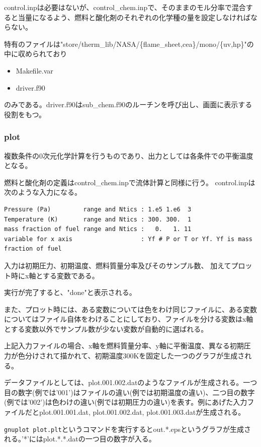 \documentclass{jsarticle}
\begin{document}
control.inpは必要はないが、control\_chem.inpで、そのままのモル分率で混合すると当量になるよう、燃料と酸化剤のそれぞれの化学種の量を設定しなければならない。

\hspace{1em}

特有のファイルは"store/therm\_lib/NASA/\{flame\_sheet,cea\}/mono/\{uv,hp\}"の中に収められており
\begin{itemize}
\item Makefile.var
\item driver.f90
\end{itemize}
のみである。driver.f90はsub\_chem.f90のルーチンを呼び出し、画面に表示する役割をもつ。
\subsubsection{plot}%
複数条件の0次元化学計算を行うものであり、出力としては各条件での平衡温度となる。

燃料と酸化剤の定義はcontrol\_chem.inpで流体計算と同様に行う。
control.inpは次のような入力になる。
\begin{verbatim}
Pressure (Pa)         range and Ntics : 1.e5 1.e6  3
Temperature (K)       range and Ntics : 300. 300.  1
mass fraction of fuel range and Ntics :   0.   1. 11
variable for x axis                   : Yf # P or T or Yf. Yf is mass fraction of fuel
\end{verbatim}
入力は初期圧力、初期温度、燃料質量分率及びそのサンプル数、
加えてプロット時にx軸とする変数である。

実行が完了すると、"done"と表示される。

また、プロット時には、ある変数については色をわけ同じファイルに、ある変数についてはファイル自体をわけることにしており、ファイルを分ける変数はx軸とする変数以外でサンプル数が少ない変数が自動的に選ばれる。

上記入力ファイルの場合、x軸を燃料質量分率、y軸に平衡温度、異なる初期圧力が色分けされて描かれて、初期温度300Kを固定した一つのグラフが生成される。

データファイルとしては、plot.001.002.datのようなファイルが生成される。一つ目の数字(例では'001')はファイルの違い(例では初期温度の違い)、二つ目の数字(例では'002')は色わけの違い(例では初期圧力の違い)を表す。例にあげた入力ファイルだとplot.001.001.dat, plot.001.002.dat, plot.001.003.datが生成される。

\verb|gnuplot plot.plt|というコマンドを実行するとout.*.epsというグラフが生成される。'*'にはplot.*.*.datの一つ目の数字が入る。
\end{document}
